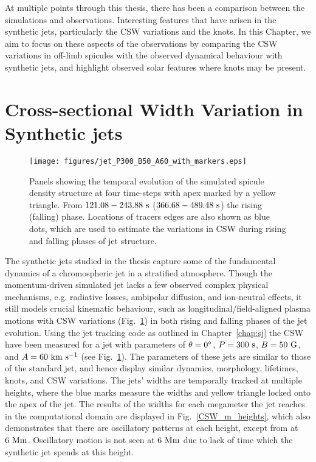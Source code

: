 %
At multiple points through this thesis, there has been a comparison between the simulations and observations. Interesting features that have arisen in the synthetic jets, particularly the CSW variations and the knots. In this Chapter, we aim to focus on these aspects of the observations by comparing the CSW variations in off-limb spicules with the observed dynamical behaviour with synthetic jets, and highlight observed solar features where knots may be present.
\section{Cross-sectional Width Variation in Synthetic jets}
\label{sec:CSW_syn_jet}
\begin{figure*}
\texttt{[image: figures/jet\_P300\_B50\_A60\_with\_markers.eps]}
\caption{Panels showing the temporal evolution of the simulated spicule density structure at four time-steps with apex marked by a yellow triangle. From $121.08-243.88 ~\rm{s}$ ($366.68-489.48~\rm{s}$)  the rising (falling) phase. Locations of tracers edges are also shown as blue dots, which are used to estimate the variations in CSW during rising and falling phases of jet structure.}
\label{jet_P300_B50_A60} 
\end{figure*}
The synthetic jets studied in the thesis capture some of the fundamental dynamics of a chromospheric jet in a stratified atmosphere. Though the momentum-driven simulated jet lacks a few observed complex physical mechanisms, e.g. radiative losses, ambipolar diffusion, and ion-neutral effects, it still models crucial kinematic behaviour, such as longitudinal/field-aligned plasma motions with CSW variations (Fig.~\ref{jet_P300_B50_A60}) in both rising and falling phases of the jet evolution. \np
%
Using the jet tracking code as outlined in Chapter~\ref{chap:sj} the CSW have been measured for a jet with parameters of $\theta =0^{\circ}$, $P=300~\rm{s}$, $B=50~\rm{G}$, and $A=60~\rm{km ~s^{-1}}$ (see Fig.~\ref{jet_P300_B50_A60}). The parameters of these jets are similar to those of the standard jet, and hence display similar dynamics, morphology, lifetimes, knots, and CSW variations. The jets' widths are temporally tracked at multiple heights, where the blue marks measure the widths and yellow triangle locked onto the apex of the jet. The results of the widths for each megameter the jet reaches in the computational domain are displayed in Fig.~\ref{CSW_m_heights}, which also demonstrates that there are oscillatory patterns at each height, except from at $6~\rm{Mm}$. Oscillatory motion is not seen at $6~\rm{Mm}$ due to lack of time which the synthetic jet spends at this height. \np
